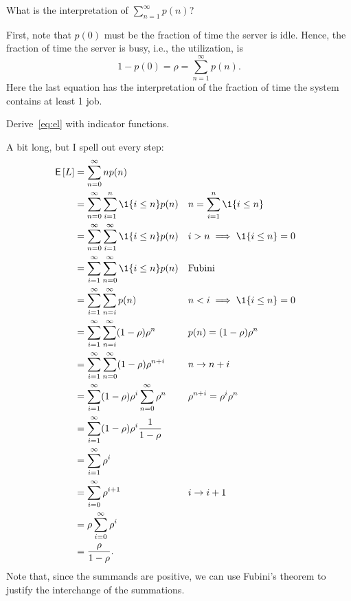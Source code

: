 \begin{extra}
  What is the interpretation of $\sum_{n=1}^\infty p(n)$?
\begin{solution}
First, note that $p(0)$ must be the fraction of time the server is idle.
Hence, the fraction of time the server is busy, i.e., the utilization, is
\begin{equation*}
  1-p(0) = \rho = \sum_{n=1}^\infty p(n).
\end{equation*}
Here the last equation has the interpretation of the fraction of time
the system contains at least 1 job. 
\end{solution}
\end{extra}


\begin{extra} \label{ex:12}
Derive~\cref{eq:el} with indicator functions.
\begin{solution}
A bit long, but I spell out every step:
\begin{align*}
\E L &= \sum_{n=0}^\infty n p(n) \\
&= \sum_{n=0}^\infty \sum_{i=1}^n \1{i\leq n} p(n)  && n=\sum_{i=1}^n \1{i\leq n}\\
&= \sum_{n=0}^\infty \sum_{i=1}^\infty   \1{i\leq n} p(n)  && i>n\implies \1{i\leq n} = 0\\
&= \sum_{i=1}^\infty \sum_{n=0}^\infty  \1{i\leq n} p(n) &&\text{Fubini} \\
&= \sum_{i=1}^\infty \sum_{n=i}^\infty p(n) && n < i \implies \1{i\leq n}=0 \\
&= \sum_{i=1}^\infty \sum_{n=i}^\infty (1-\rho)\rho^n && p(n) = (1-\rho)\rho^n \\
&= \sum_{i=1}^\infty \sum_{n=0}^\infty (1-\rho)\rho^{n+i} && n\to n+i \\
&= \sum_{i=1}^\infty (1-\rho)\rho^i \sum_{n=0}^\infty \rho^n && \rho^{n+i}=\rho^i \rho^n\\
&= \sum_{i=1}^\infty (1-\rho)\rho^i \frac1{1-\rho}   \\
&= \sum_{i=1}^\infty \rho^i \\
&= \sum_{i=0}^\infty \rho^{i+1} && i\to i+1\\
&= \rho \sum_{i=0}^\infty \rho^i \\
&= \frac{\rho}{1-\rho}.
\end{align*}
Note that, since the summands are positive, we can use Fubini's theorem
to justify the interchange of the summations.
\end{solution}
\end{extra}

